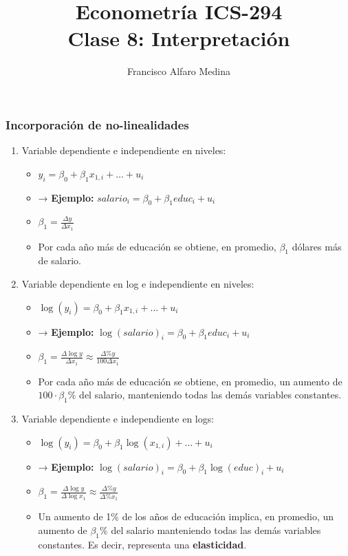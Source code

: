 \documentclass{beamer}
\title[ICS-162]{Econometría ICS-294\\ \small{Clase 8: Interpretaci\'on}}
\author{Francisco Alfaro Medina}
\institute[USM]
{Universidad Técnica Federico Santa María\\ %
	\medskip
	\textit{} %
	
}
\date{}
\begin{document}
	
\begin{frame}
	\titlepage %


\end{frame}

\begin{frame}[shrink=10]
\frametitle{Incorporación de no-linealidades}
    \begin{enumerate}
        \item {\color{blue}Variable dependiente e independiente en niveles:}
        \begin{itemize}
            \item[] \begin{center}$y_i = \beta_0 + \beta_1 x_{1,i} + \ldots + u_i$\end{center}
            \item → \textbf{Ejemplo:} $salario_i = \beta_0 + \beta_1 educ_i + u_i$
            \item $\beta_1 = \frac{\Delta y}{\Delta x_1}$
            \item Por cada año más de educación se obtiene, en promedio, $\beta_1$ dólares más de salario.
        \end{itemize}
        \item {\color{blue}Variable dependiente en log e independiente en niveles:}
        \begin{itemize}
            \item[] \begin{center} $\log(y_i) = \beta_0 + \beta_1 x_{1,i} + \ldots + u_i$\end{center}
            \item → \textbf{Ejemplo:} $\log(salario)_i = \beta_0 + \beta_1 educ_i + u_i$
            \item $\beta_1 = \frac{\Delta \log y}{\Delta x_1}\approx \frac{\Delta \% y}{100\Delta x_1}$
            \item Por cada año más de educación se obtiene, en promedio, un aumento de $100 \cdot \beta_1 \%$ del salario, manteniendo todas las demás variables constantes.
        \end{itemize}
        \item {\color{blue}Variable dependiente e independiente en logs:}
        \begin{itemize}
            \item[] \begin{center}$\log(y_i) = \beta_0 + \beta_1 \log(x_{1,i}) + \ldots + u_i$\end{center}
            \item → \textbf{Ejemplo:} $\log(salario)_i = \beta_0 + \beta_1 \log(educ)_i + u_i$
            \item $\beta_1 = \frac{\Delta \log y}{\Delta \log x_1}\approx \frac{\Delta\% y}{ \Delta\% x_1}$
            \item Un aumento de 1\% de los años de educación implica, en promedio, un aumento de $\beta_1 \%$ del salario manteniendo todas las demás variables constantes. Es decir, representa una {\bf elasticidad}.
        \end{itemize}
    \end{enumerate}



\end{frame}
\end{document}

